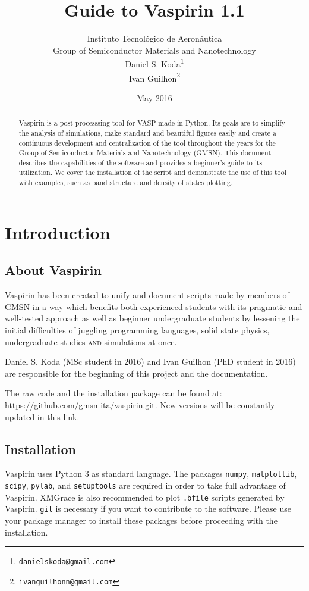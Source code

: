 \documentclass{refart}
\title{Guide to Vaspirin 1.1}
\author{Instituto Tecnológico de Aeronáutica\\
	Group of Semiconductor Materials and Nanotechnology\\
	Daniel S. Koda\thanks{\texttt{danielskoda@gmail.com}}\\
	Ivan Guilhon\thanks{\texttt{ivanguilhonn@gmail.com}}}
\date{May 2016}
\begin{document}
\maketitle

\begin{abstract}
	Vaspirin is a post-processsing tool for VASP made in Python. Its goals are to simplify the analysis of simulations, make standard and beautiful figures easily and create a continuous development and centralization of the tool throughout the years for the Group of Semiconductor Materials and Nanotechnology (GMSN). This document describes the capabilities of the software and provides a beginner's guide to its utilization. We cover the installation of the script and demonstrate the use of this tool with examples, such as band structure and density of states plotting.
\end{abstract}

\tableofcontents

\section{Introduction}

\subsection{About Vaspirin}

 Vaspirin has been created to unify and document scripts made by members of GMSN in a way which benefits both experienced students with its pragmatic and well-tested approach as well as beginner undergraduate students by lessening the initial difficulties of juggling programming languages, solid state physics, undergraduate studies \textsc{and} simulations at once.

 Daniel S. Koda (MSc student in 2016) and Ivan Guilhon (PhD student in 2016) are responsible for the beginning of this project and the documentation.

	 The raw code and the installation package can be found at: \url{https://github.com/gmsn-ita/vaspirin.git}. New versions will be constantly updated in this link.

\subsection{Installation}

 Vaspirin uses Python 3 as standard language. The packages \texttt{numpy}, \texttt{matplotlib}, \texttt{scipy}, \texttt{pylab}, and \texttt{setuptools} are required in order to take full advantage of Vaspirin. XMGrace is also recommended to plot \texttt{.bfile} scripts generated by Vaspirin. \texttt{git} is necessary if you want to contribute to the software. Please use your package manager to install these packages before proceeding with the installation.
\end{document}
